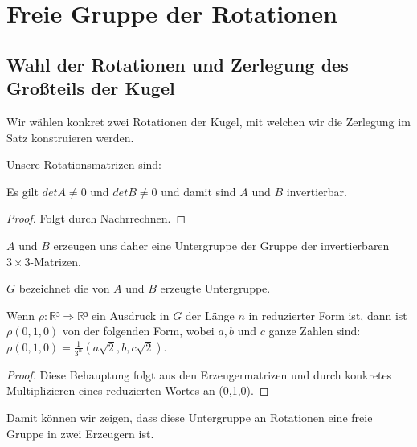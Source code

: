 \chapter{Freie Gruppe der Rotationen}


\section{Wahl der Rotationen und Zerlegung des Großteils der Kugel}




Wir wählen konkret zwei Rotationen der Kugel, mit welchen wir die Zerlegung im Satz konstruieren werden.
\begin{definition}\label{def:konk_rot}
\leanok {}
Unsere Rotationsmatrizen sind: 

\end{definition}

\begin{lemma} \label{lemma:a_b_invertierbar}
Es gilt $det A\neq 0$ und $det B\neq 0$ und damit sind $A$ und $B$ invertierbar.
\leanok
\end{lemma}
\begin{proof}  \leanok 
Folgt durch Nachrrechnen.
\end{proof}

$A$ und $B$ erzeugen uns daher eine Untergruppe der Gruppe der invertierbaren $3\times3$-Matrizen.
\begin{definition}\label{def:konk_rot_erzeugt} 
$G$ bezeichnet die von $A$ und $B$ erzeugte Untergruppe.
\leanok {}
\end{definition}


\begin{lemma}\label{lem:darst_von_rot_res}
\leanok
Wenn $\rho : \mathbb{R}³\Rightarrow\mathbb{R}³$ ein Ausdruck in $G$ der Länge 
$n$ in reduzierter Form ist, dann ist $\rho(0,1,0)$ von der folgenden Form, wobei
$a, b$ und $c$ ganze Zahlen sind: $\rho(0,1,0)=\frac{1}{3^n}(a\sqrt{2},b,c\sqrt{2})$.
\end{lemma}
\begin{proof} 
\leanok Diese Behauptung folgt aus den Erzeugermatrizen
und durch konkretes Multiplizieren eines reduzierten Wortes an (0,1,0).
\end{proof}
Damit können wir zeigen, dass diese Untergruppe an Rotationen eine freie Gruppe in zwei Erzeugern ist.


